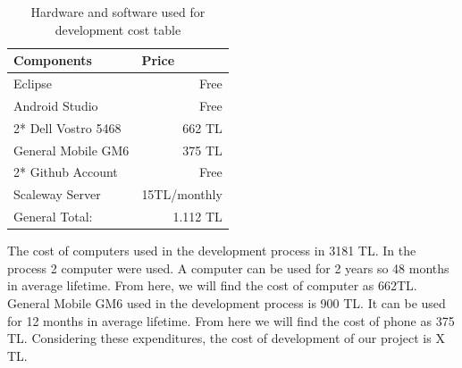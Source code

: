 \begin{table}[!h!]
\centering
\caption{Hardware and software used for development cost table}
\label{tab:hardsoftcost}
\begin{tabular}{|l|r|}
\hline
\textbf{Components}             & \multicolumn{1}{l|}{\textbf{Price}} \\ \hline
Eclipse \cite{eclipse} & Free \\ \hline
Android Studio \cite{androidStudio} & Free \\ \hline
2* Dell Vostro 5468 & 662 TL \\ \hline
General Mobile GM6 \cite{gm6} & 375 TL                            \\ \hline
2* Github Account                  & Free                             \\ \hline
Scaleway Server                  & 15TL/monthly                             \\ \hline
General Total:                  & 1.112 TL                            \\ \hline
\end{tabular}
\end{table}
The cost of computers used in the development process in 3181 TL\cite{dell}. In the process 2 computer were used. A computer can be used for 2 years so 48 months in average lifetime. From here, we will find the cost of computer as 662TL. General Mobile GM6 used in the development process is 900 TL\cite{gm6}. It can be used for 12 months in average lifetime. From here we will find the cost of phone as 375 TL. Considering these expenditures, the cost of development of our project is X TL.
